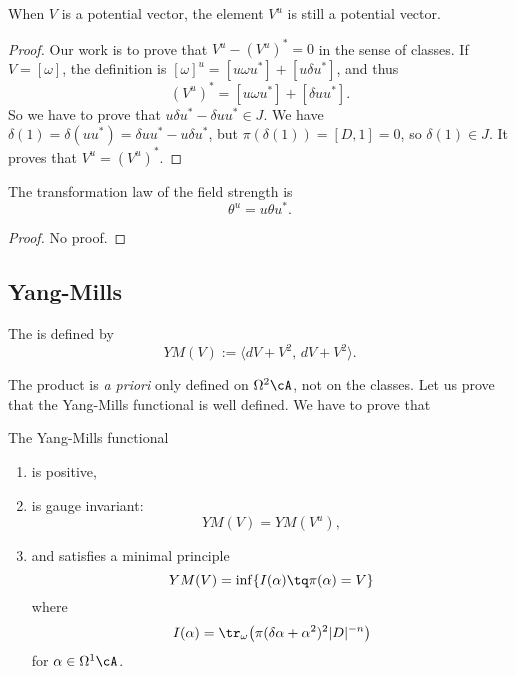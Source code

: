 \begin{lemma}
When $V$ is a potential vector, the element $V^{u}$ is still a potential vector.
\end{lemma}

\begin{proof}
Our work is to prove that $V^{u}-(V^{u})^*=0$ in the sense of classes. If $V=[\omega]$, the definition is $[\omega]^{u}=[u\omega u^*]+[u\delta u^*]$, and thus
\[ 
  (V^{u})^*=[u\omega u^*]+[\delta uu^*].
\]
So we have to prove that $u\delta u^*-\delta uu^*\in J$. We have $\delta(1)=\delta(uu^*)=\delta uu^*-u\delta u^*$, but $\pi(\delta(1))=[D,1]=0$, so $\delta(1)\in J$. It proves that $V^{u}=(V^{u})^*$.
\end{proof}

\begin{lemma}   
The transformation law of the field strength is 
\begin{equation}
\theta^{u}=u\theta u^*.
\label{LemTrFieldStrm}
\end{equation}

\end{lemma}
\begin{proof}
No proof.
\end{proof}

\subsection{Yang-Mills}

The  is defined by
\begin{equation}
YM(V):=\langle dV+V^{2},\,dV+V^{2}\rangle.
\end{equation}

The product is \emph{a priori} only defined on $\Omega^2\cA$, not on the classes. Let us prove that the Yang-Mills functional is well defined. We have to prove that

\begin{theorem}
 The Yang-Mills functional
\begin{enumerate}
\item is positive,
\item is gauge invariant:
\begin{equation}
YM(V)=YM(V^{u}),
\end{equation}
\item and satisfies a minimal principle
\begin{equation}
  YM(V)=\inf\{ I(\alpha)\tq \pi(\alpha)=V \}
\end{equation}
where
\[ 
  I(\alpha)=\tr_{\omega}\big( \pi(\delta\alpha+\alpha^{2})^{2}|D|^{-n} \big)
\]
for $\alpha\in\Omega^1\cA$.
\end{enumerate}

\end{theorem}

